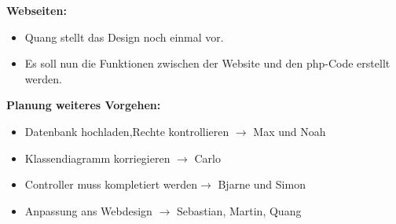 \documentclass[11pt,a4paper]{scrbook}
\begin{document}
\vspace{1cm}
\textbf{Webseiten:}
\begin{itemize}
\item Quang stellt das Design noch einmal vor.
\item Es soll nun die Funktionen zwischen der Website und den php-Code erstellt werden.
\end{itemize}
\vspace{1cm}
\textbf{Planung weiteres Vorgehen:}\\
\begin{itemize}
\item Datenbank hochladen,Rechte kontrollieren $\rightarrow$ Max und Noah
\item Klassendiagramm korriegieren $\rightarrow$ Carlo
\item Controller muss kompletiert werden$\rightarrow$ Bjarne und Simon
\item Anpassung ans Webdesign $\rightarrow$ Sebastian, Martin, Quang
\end{itemize}
\end{document}
